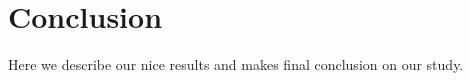 \section{Conclusion}
\label{sec:conclusion}

Here we describe our nice results and makes final conclusion on our study. 
